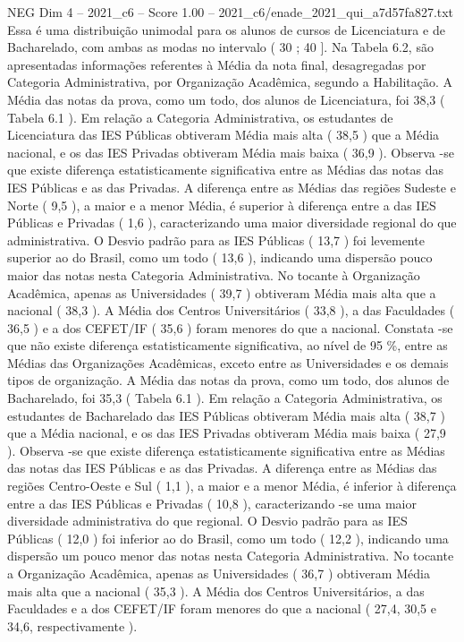 \begin{textsample}{NEG Dim 4 – 2021\_c6 – Score 1.00 – 2021\_c6/enade\_2021\_qui\_a7d57fa827.txt}
Essa é uma distribuição unimodal para os alunos de cursos de Licenciatura e de Bacharelado, com ambas as modas no intervalo ( 30 ; 40 ].
Na Tabela 6.2, são apresentadas informações referentes à Média da nota final, desagregadas por Categoria Administrativa, por Organização Acadêmica, segundo a Habilitação.
A Média das notas da prova, como um todo, dos alunos de Licenciatura, foi 38,3 ( Tabela 6.1 ).
Em relação a Categoria Administrativa, os estudantes de Licenciatura das IES Públicas obtiveram Média mais alta ( 38,5 ) que a Média nacional, e os das IES Privadas obtiveram Média mais baixa ( 36,9 ).
Observa -se que existe diferença estatisticamente significativa entre as Médias das notas das IES Públicas e as das Privadas.
A diferença entre as Médias das regiões Sudeste e Norte ( 9,5 ), a maior e a menor Média, é superior à diferença entre a das IES Públicas e Privadas ( 1,6 ), caracterizando uma maior diversidade regional do que administrativa.
O Desvio padrão para as IES Públicas ( 13,7 ) foi levemente superior ao do Brasil, como um todo ( 13,6 ), indicando uma dispersão pouco maior das notas nesta Categoria Administrativa.
No tocante à Organização Acadêmica, apenas as Universidades ( 39,7 ) obtiveram Média mais alta que a nacional ( 38,3 ).
A Média dos Centros Universitários ( 33,8 ), a das Faculdades ( 36,5 ) e a dos CEFET/IF ( 35,6 ) foram menores do que a nacional.
Constata -se que não existe diferença estatisticamente significativa, ao nível de 95 \%, entre as Médias das Organizações Acadêmicas, exceto entre as Universidades e os demais tipos de organização.
A Média das notas da prova, como um todo, dos alunos de Bacharelado, foi 35,3 ( Tabela 6.1 ).
Em relação a Categoria Administrativa, os estudantes de Bacharelado das IES Públicas obtiveram Média mais alta ( 38,7 ) que a Média nacional, e os das IES Privadas obtiveram Média mais baixa ( 27,9 ).
Observa -se que existe diferença estatisticamente significativa entre as Médias das notas das IES Públicas e as das Privadas.
A diferença entre as Médias das regiões Centro-Oeste e Sul ( 1,1 ), a maior e a menor Média, é inferior à diferença entre a das IES Públicas e Privadas ( 10,8 ), caracterizando -se uma maior diversidade administrativa do que regional.
O Desvio padrão para as IES Públicas ( 12,0 ) foi inferior ao do Brasil, como um todo ( 12,2 ), indicando uma dispersão um pouco menor das notas nesta Categoria Administrativa.
No tocante a Organização Acadêmica, apenas as Universidades ( 36,7 ) obtiveram Média mais alta que a nacional ( 35,3 ).
A Média dos Centros Universitários, a das Faculdades e a dos CEFET/IF foram menores do que a nacional ( 27,4, 30,5 e 34,6, respectivamente ).

\end{textsample}
